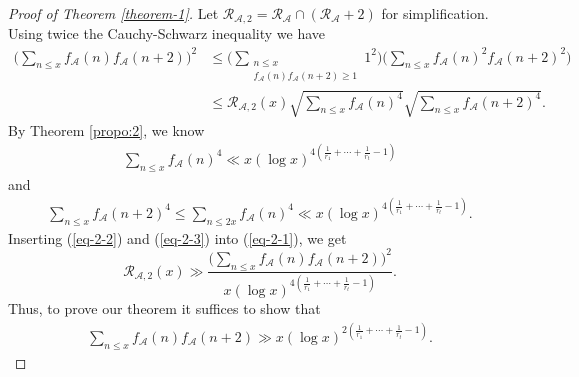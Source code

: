 \documentclass[12pt,a4paper,reqno]{amsart}
\numberwithin{equation}{section}
\theoremstyle{plain}
\theoremstyle{definition}
\begin{document}
\begin{proof}[Proof of Theorem \ref{theorem-1}]
Let $\mathcal{R}_{\mathcal{A},2}=\mathcal{R}_{\mathcal{A}}\cap(\mathcal{R}_{\mathcal{A}}+2)$ for simplification. Using twice the Cauchy-Schwarz inequality we have
\begin{align}\label{eq-2-1}
\Big(\sum_{n\le x} f_{\mathcal{A}}(n)f_{\mathcal{A}}(n+2)\Big)^2&\le \Big(\sum_{\substack{n\le x\\ f_{\mathcal{A}}(n)f_{\mathcal{A}}(n+2)\ge 1}} 1^2 \Big)\Big(\sum_{n\le x} f_{\mathcal{A}}(n)^2f_{\mathcal{A}}(n+2)^2\Big)\nonumber\\
&\le \mathcal{R}_{\mathcal{A},2}(x)\sqrt{\sum_{n\le x} f_{\mathcal{A}}(n)^4}\sqrt{\sum_{n\le x} f_{\mathcal{A}}(n+2)^4}.
\end{align}
By Theorem \ref{propo:2}, we know
\begin{align}\label{eq-2-2}
\sum_{n\le x} f_{\mathcal{A}}(n)^4\ll x (\log x)^{4\left(\frac{1}{r_1}+\cdots+\frac{1}{r_t}-1\right)}
\end{align}
and
\begin{align}\label{eq-2-3}
\sum_{n\le x} f_{\mathcal{A}}(n+2)^4\le \sum_{n\le 2x} f_{\mathcal{A}}(n)^4 \ll x (\log x)^{4\left(\frac{1}{r_1}+\cdots+\frac{1}{r_t}-1\right)}.
\end{align}
Inserting  (\ref{eq-2-2}) and (\ref{eq-2-3}) into (\ref{eq-2-1}), we get
$$
\mathcal{R}_{\mathcal{A},2}(x)\gg \frac{\Big(\sum_{n\le x} f_{\mathcal{A}}(n)f_{\mathcal{A}}(n+2)\Big)^2}{x(\log x)^{4\left(\frac{1}{r_1}+\cdots+\frac{1}{r_t}-1\right)}}.
$$
Thus, to prove our theorem it suffices to show that
\begin{align}\label{eq-2-4}
\sum_{n\le x} f_{\mathcal{A}}(n)f_{\mathcal{A}}(n+2)\gg x(\log x)^{2\left(\frac{1}{r_1}+\cdots+\frac{1}{r_t}-1\right)}.
\end{align}


\end{proof}
\end{document}
